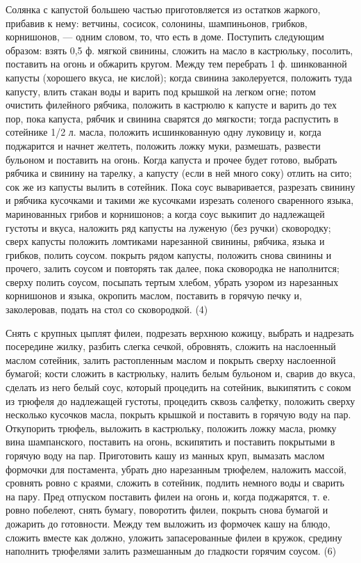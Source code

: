 Солянка с капустой большею частью приготовляется из остатков жаркого, прибавив к нему: ветчины, сосисок, солонины, шампиньонов, грибков, корнишонов, — одним словом, то, что есть в доме. Поступить следующим образом: взять 0,5 ф. мягкой свинины, сложить на масло в кастрюльку, посолить, поставить на огонь и обжарить кругом. Между тем перебрать 1 ф. шинкованной капусты (хорошего вкуса, не кислой); когда свинина заколеруется, положить туда капусту, влить стакан воды и варить под крышкой на легком огне; потом очистить филейного рябчика, положить в кастрюлю к капусте и варить до тех пор, пока капуста, рябчик и свинина сварятся до мягкости; тогда распустить в сотейнике 1/2 л. масла, положить исшинкованную одну луковицу и, когда поджарится и начнет желтеть, положить ложку муки, размешать, развести бульоном и поставить на огонь. Когда капуста и прочее будет готово, выбрать рябчика и свинину на тарелку, а капусту (если в ней много соку) отлить на сито; сок же из капусты вылить в сотейник. Пока соус вываривается, разрезать свинину и рябчика кусочками и такими же кусочками изрезать соленого сваренного языка, маринованных грибов и корнишонов; а когда соус выкипит до надлежащей густоты и вкуса, наложить ряд капусты на луженую (без ручки) сковородку; сверх капусты положить ломтиками нарезанной свинины, рябчика, языка и грибков, полить соусом. покрыть рядом капусты, положить снова свинины и прочего, залить соусом и повторять так далее, пока сковородка не наполнится; сверху полить соусом, посыпать тертым хлебом, убрать узором из нарезанных корнишонов и языка, окропить маслом, поставить в горячую печку и, заколеровав, подать на стол со сковородкой. (4) 


Снять с крупных цыплят филеи, подрезать верхнюю кожицу, выбрать и надрезать посередине жилку, разбить слегка сечкой, обровнять, сложить на наслоенный маслом сотейник, залить растопленным маслом и покрыть сверху наслоенной бумагой; кости сложить в кастрюльку, налить белым бульоном и, сварив до вкуса, сделать из него белый соус, который процедить на сотейник, выкипятить с соком из трюфеля до надлежащей густоты, процедить сквозь салфетку, положить сверху несколько кусочков масла, покрыть крышкой и поставить в горячую воду на пар. Откупорить трюфель, выложить в кастрюльку, положить ложку масла, рюмку вина шампанского, поставить на огонь, вскипятить и поставить покрытыми в горячую воду на пар. Приготовить кашу из манных круп, вымазать маслом формочки для постамента, убрать дно нарезанным трюфелем, наложить массой, сровнять ровно с краями, сложить в сотейник, подлить немного воды и сварить на пару. Пред отпуском поставить филеи на огонь и, когда поджарятся, т. е. ровно побелеют, снять бумагу, поворотить филеи, покрыть снова бумагой и дожарить до готовности. Между тем выложить из формочек кашу на блюдо, сложить вместе как должно, уложить запасерованные филеи в кружок, средину наполнить трюфелями залить размешанным до гладкости горячим соусом. (6) 

